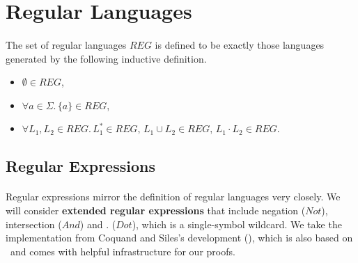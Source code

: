 \documentclass[11pt,a4paper,oneside]{book}
\begin{document}
        \section{Regular Languages}
        
    
            \paragraph{}
            The set of regular languages $REG$ is defined to be exactly those languages generated by the following inductive definition.
            \begin{itemize}
                \item
                    $\emptyset \in REG$, 
                \item
                    $\forall a \in \Sigma. \, \{a\} \in REG$, 
                \item
                    $\forall L_1, L_2 \in REG. \, L_1^* \in REG, \, L_1 \cup L_2 \in REG, \, L_1 \cdot L_2 \in REG$.
            \end{itemize}


        \subsection{Regular Expressions}

                \paragraph{} 
                Regular expressions mirror the definition of regular languages very closely. 
                We will consider \textbf{extended regular expressions} that include negation ($Not$), intersection ($And$) and $.$ ($Dot$), which is a single-symbol wildcard. 
                We take the implementation from Coquand and Siles's development (\cite{DBLP:conf/cpp/CoquandS11}), which is also based on \ssreflect\ and comes with helpful infrastructure for our proofs.
\end{document}

